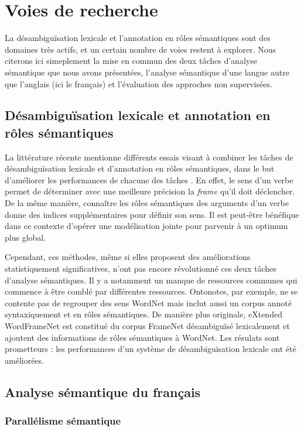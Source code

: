 \section{Voies de recherche}

La désambiguïsation lexicale et l'annotation en rôles sémantiques sont des domaines très actifs, et un certain nombre de voies restent à explorer. Nous citerons ici simeplement la mise en commun des deux tâches d'analyse sémantique que nous avons présentées, l'analyse sémantique d'une langue autre que l'anglais (ici le français) et l'évaluation des approches non supervisées.

\subsection{Désambiguïsation lexicale et annotation en rôles sémantiques}

La littérature récente mentionne différents essais visant à combiner les tâches de désambiguïsation lexicale et d'annotation en rôles sémantiques, dans le but d'améliorer les performances de chacune des tâches \citep{megalol}. En effet, le sens d'un verbe permet de déterminer avec une meilleure précision la \textit{frame} qu'il doit déclencher. De la même manière, connaître les rôles sémantiques des arguments d'un verbe donne des indices supplémentaires pour définir son sens. Il est peut-être bénéfique dans ce contexte d'opérer une modélisation jointe pour parvenir à un optimum plus global.

Cependant, ces méthodes, même si elles proposent des améliorations statistiquement significatives, n'ont pas encore révolutionné ces deux tâches d'analyse sémantiques. Il y a notamment un manque de ressources communes qui commence à être comblé par différentes ressources. Ontonotes, par exemple, ne se contente pas de regrouper des sens WordNet mais inclut aussi un corpus annoté syntaxiquement et en rôles sémantiques. De manière plus originale, eXtended WordFrameNet \citep{olol} est constitué du corpus FrameNet désambiguïsé lexicalement et ajoutent des informations de rôles sémantiques à WordNet. Les résulats sont prometteurs : les performances d'un système de désambiguïsation lexicale ont été améliorées.

\subsection{Analyse sémantique du français}

\subsubsection{Parallélisme sémantique}

